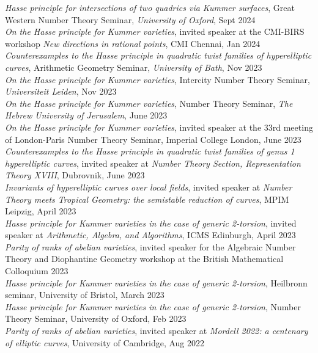 \documentclass{res}
\begin{document}
\begin{resume}
 \medskip
  {\it  Hasse principle for intersections of two quadrics via Kummer surfaces}, Great Western Number Theory Seminar, \textit{University of Oxford},   Sept 2024    \medskip  \\
   {\it  On the Hasse principle for Kummer varieties}, invited speaker at the CMI-BIRS workshop \textit{New directions in rational points}, CMI Chennai,   Jan 2024    \medskip  \\
 {\it  Counterexamples to the Hasse principle in quadratic twist families of hyperelliptic curves}, Arithmetic Geometry Seminar, {\it University of Bath}, Nov 2023    \medskip  \\
  {\it  On the Hasse principle for Kummer varieties}, Intercity Number Theory Seminar, {\it Universiteit Leiden}, Nov 2023    \medskip  \\
{\it  On the Hasse principle for Kummer varieties}, Number Theory Seminar, {\it The Hebrew University of Jerusalem}, June 2023    \medskip  \\
{\it  On the Hasse principle for Kummer varieties}, invited speaker at the 33rd meeting of London-Paris Number Theory Seminar, Imperial College London, June 2023    \medskip  \\
{\it  Counterexamples to the Hasse principle in quadratic twist families of genus 1
hyperelliptic curves}, invited speaker at {\it Number Theory Section, Representation Theory XVIII}, Dubrovnik, June 2023    \medskip  \\
{\it  Invariants of hyperelliptic curves over local fields}, invited speaker at {\it Number Theory meets Tropical Geometry: the semistable reduction of curves}, MPIM Leipzig, April 2023    \medskip  \\
{\it  Hasse principle for Kummer varieties in the case of generic 2-torsion}, invited speaker at {\it Arithmetic, Algebra, and Algorithms}, ICMS Edinburgh, April 2023    \medskip  \\
{\it  Parity of ranks of abelian varieties}, invited speaker for the Algebraic Number Theory and Diophantine Geometry workshop at the British Mathematical Colloquium 2023 \medskip  \\
{\it  Hasse principle for Kummer varieties in the case of generic 2-torsion}, Heilbronn seminar, University of Bristol, March 2023    \medskip  \\
{\it  Hasse principle for Kummer varieties in the case of generic 2-torsion}, Number Theory Seminar, University of Oxford, Feb 2023    \medskip  \\
{\it  Parity of ranks of abelian varieties}, invited speaker at {\it Mordell 2022: a centenary of elliptic curves}, University of Cambridge, Aug 2022    \medskip  \\

\end{resume}
\end{document}
